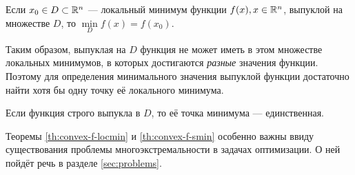 \begin{thm}
  \label{th:convex-f-locmin}
  Если $x_0 \in D \subset \mathbb{R}^n$ — локальный минимум функции
  $f(x), x \in \mathbb{R}^n$, выпуклой на множестве $D$, то
  $\underset{D}{\min}{f(x)} = f(x_0)$.
\end{thm}
Таким образом, выпуклая на $D$ функция не может иметь в этом множестве
локальных минимумов, в которых достигаются \emph{разные} значения
функции. Поэтому для определения минимального значения выпуклой
функции достаточно найти хотя бы одну точку её локального минимума.

\begin{thm}
  \label{th:convex-f-smin}
  Если функция строго выпукла в $D$, то её точка минимума —
  единственная.
\end{thm}

Теоремы \ref{th:convex-f-locmin} и \ref{th:convex-f-smin} особенно
важны ввиду существования проблемы многоэкстремальности в задачах
оптимизации. О ней пойдёт речь в разделе \ref{sec:problems}.